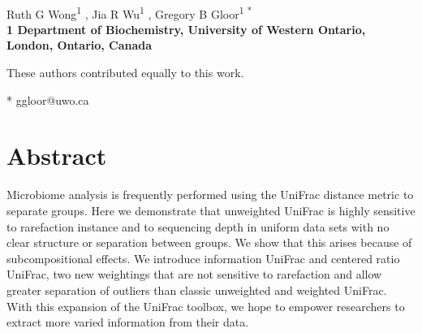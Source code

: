 \documentclass[10pt,letterpaper]{article}
\date{}
\begin{document}
\vspace*{0.35in}

\begin{flushleft}
{\Large
\textbf{}
}
\newline
\\
Ruth G Wong\textsuperscript{1 \Yinyang},
Jia R Wu\textsuperscript{1 \Yinyang},
Gregory B Gloor\textsuperscript{1 *}
\\
\bigskip
\bf{1} Department of Biochemistry, University of Western Ontario, London, Ontario, Canada
\\
\bigskip

% 
%
\Yinyang These authors contributed equally to this work.





* ggloor@uwo.ca

\end{flushleft}
\section*{Abstract}
Microbiome analysis is frequently performed using the UniFrac distance metric to separate groups. Here we demonstrate that unweighted UniFrac is highly sensitive to rarefaction instance and to sequencing depth in uniform data sets with no clear structure or separation between groups. We show that this arises because of subcompositional effects. We introduce information UniFrac and centered ratio UniFrac, two new weightings that are not sensitive to rarefaction and allow greater separation of outliers than classic unweighted and weighted UniFrac. With this expansion of the UniFrac toolbox, we hope to empower researchers to extract more varied information from their data.
\end{document}
